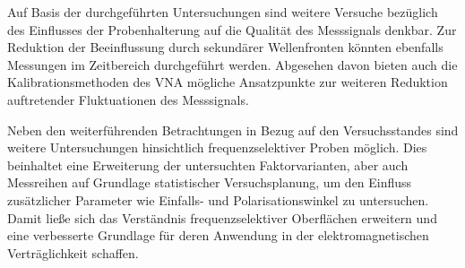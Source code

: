 \par
\vspace{\linespace}
Auf Basis der durchgeführten Untersuchungen sind weitere Versuche bezüglich des Einflusses der Probenhalterung auf die Qualität des Messsignals denkbar. Zur Reduktion der Beeinflussung durch sekundärer Wellenfronten könnten ebenfalls Messungen im Zeitbereich durchgeführt werden. Abgesehen davon bieten auch die Kalibrationsmethoden des VNA mögliche Ansatzpunkte zur weiteren Reduktion auftretender Fluktuationen des Messsignals.
\par
\vspace{\linespace}
Neben den weiterführenden Betrachtungen in Bezug auf den Versuchsstandes sind weitere Untersuchungen hinsichtlich frequenzselektiver Proben möglich. Dies beinhaltet eine Erweiterung der untersuchten Faktorvarianten, aber auch Messreihen auf Grundlage statistischer Versuchsplanung, um den Einfluss zusätzlicher Parameter wie Einfalls- und Polarisationswinkel zu untersuchen. Damit ließe sich das Verständnis frequenzselektiver Oberflächen erweitern und eine verbesserte Grundlage für deren Anwendung in der elektromagnetischen Verträglichkeit schaffen.

















